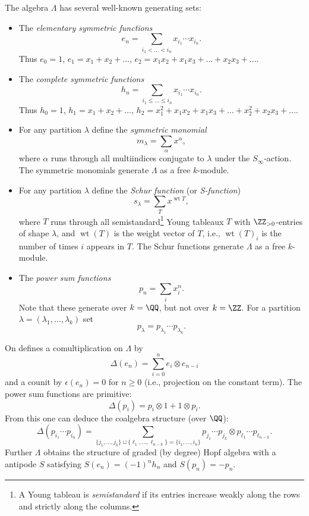 \documentclass{ck-article}
\newcommand\SymGrp[1]{S_{#1}}
\begin{document}
The algebra $\Lambda$ has several well-known generating sets:
\begin{itemize}
    \item The \emph{elementary symmetric functions} 
        \[
            e_n = \sum_{i_1 < \dots < i_n} x_{i_1} \dotsm x_{i_n}.
        \]
        Thus $e_0 = 1$, $e_1 = x_1 + x_2 + \dots$, $e_2 = x_1x_2 + x_1x_3 + \dots + x_2x_3  + \dots$.
    \item The \emph{complete symmetric functions} 
        \[
            h_n = \sum_{i_1 \le \dots \le i_n} x_{i_1} \dotsm x_{i_n}.
        \]
        Thus $h_0 = 1$, $h_1 = x_1 + x_2 + \dots$, $h_2 = x_1^2 + x_1x_2 + x_1x_3 + \dots + x_2^2 + x_2x_3  + \dots$.
    \item For any partition $\lambda$ define the \emph{symmetric monomial}
        \[
            m_\lambda = \sum_{\alpha} x^\alpha,
        \]
        where $\alpha$ runs through all multiindices conjugate to $\lambda$ under the $\SymGrp\infty$-action.
        The symmetric monomials generate $\Lambda$ as a free $k$-module.
    \item For any partition $\lambda$ define the \emph{Schur function} (or \emph{S-function})
        \[
            s_\lambda = \sum_T x^{\operatorname{wt} T},
        \]
        where $T$ runs through all semistandard\footnote{A Young tableau is \emph{semistandard} if its entries increase weakly along the rows and strictly along the columns.} Young tableaux $T$ with $\ZZ_{>0}$-entries of shape $\lambda$, and $\operatorname{wt}(T)$ is the weight vector of $T$, i.e., $\operatorname{wt}(T)_i$ is the number of times $i$ appears in $T$.
        The Schur functions generate $\Lambda$ as a free $k$-module.
    \item The \emph{power sum functions}
        \[
            p_n = \sum_i x_i^n.
        \]
        Note that these generate over $k = \QQ$, but not over $k=\ZZ$.
        For a partition $\lambda = (\lambda_1,\dots,\lambda_k)$ set
        \[
            p_\lambda = p_{\lambda_1}\dotsm p_{\lambda_k}.
        \]
\end{itemize}
On defines a comultiplication on $\Lambda$ by
\[
    \Delta(e_n) = \sum_{i=0}^n e_i \otimes e_{n-i}
\]
and a counit by $\epsilon(e_n) = 0$ for $n \ge 0$ (i.e., projection on the constant term).
The power sum functions are primitive:
\[
    \Delta(p_i) = p_{i} \otimes 1 + 1 \otimes p_i.
\]
From this one can deduce the coalgebra structure (over $\QQ$):
\[
    \Delta(p_{i_1}\dotsm p_{i_n}) =
    \sum_{\{j_1,\dots,j_k\} \sqcup \{\ell_1, \dots, \ell_{n-k}\} = \{i_1,\dots,i_n\}} p_{j_1}\dotsm p_{j_k} \otimes p_{\ell_{1}}\dotsm p_{\ell_{n-k}}.
\] 
Further $\Lambda$ obtains the structure of graded (by degree) Hopf algebra with a antipode $S$ satisfying $S(e_n) = (-1)^n h_n$ and $S(p_n) = -p_n$.
\end{document}
